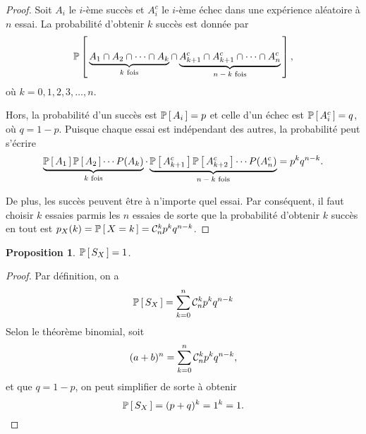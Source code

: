 \documentclass[11pt]{article}
\newcommand\comb[2]{%
	\ensuremath{%
		\mathcal{C}_{#2}^{#1}%
	}%
}%
\renewcommand\P[1]{%
	\ensuremath{%
		\mathbb{P}\left[\,#1\,\right]%
	}%
}%
\newtheorem*{proposition}{Proposition}
\theoremstyle{remark}
\theoremstyle{definition}
\begin{document}
\begin{proof}
	Soit $A_i$ le $i$-ème succès et $A_i^c$ le $i$-ème échec dans une
	expérience aléatoire à $n$ essai. La probabilité d'obtenir $k$ succès est
	donnée par
	\begin{equation*}
		\P{
			\underbrace{A_1\cap A_2\cap\cdots\cap A_k}_\text{$k$ fois}
			\cap
			\underbrace{A_{k+1}^c\cap A_{k+1}^c\cap\cdots\cap A_n^c}_
			\text{$n-k$ fois}
		},
	\end{equation*}
	où $k=0,1,2,3,\dots,n$.

	Hors, la probabilité d'un succès est $\P{A_i}=p$ et celle d'un échec est
	$\P{A_i^c}=q$, où $q=1-p$. Puisque chaque essai est indépendant des autres,
	la probabilité peut s'écrire
	\begin{equation*}
		\underbrace{
			\P{A_1}\P{A_2}\cdots P(A_k)
		}_\text{$k$ fois}
		\cdot
		\underbrace{
			\P{A_{k+1}^c}\P{A_{k+2}^c}\cdots P(A_n^c)
		}_\text{$n-k$ fois}
		=p^kq^{n-k}.
	\end{equation*}

	De plus, les succès peuvent être à n'importe quel essai. Par conséquent,
	il faut choisir $k$ essaies parmis les $n$ essaies de sorte que la
	probabilité d'obtenir $k$ succès en tout est
	$p_X(k)=\P{X=k}=\comb{k}{n}p^kq^{n-k}$.
\end{proof}

\begin{proposition}
	$\P{S_X}=1$.
\end{proposition}

\begin{proof}
	Par définition, on a
	\begin{equation*}
		\P{S_X}=\sum_{k=0}^n\comb{k}{n}p^kq^{n-k}
	\end{equation*}
	Selon le théorème binomial, soit
	\begin{equation*}
		(a+b)^n=\sum_{k=0}^n\comb{k}{n}p^kq^{n-k},
	\end{equation*}
	et que $q=1-p$, on peut simplifier de sorte à obtenir
	\begin{equation*}
		\P{S_X}=(p+q)^k=1^k=1.\qedhere
	\end{equation*}
\end{proof}
\end{document}
